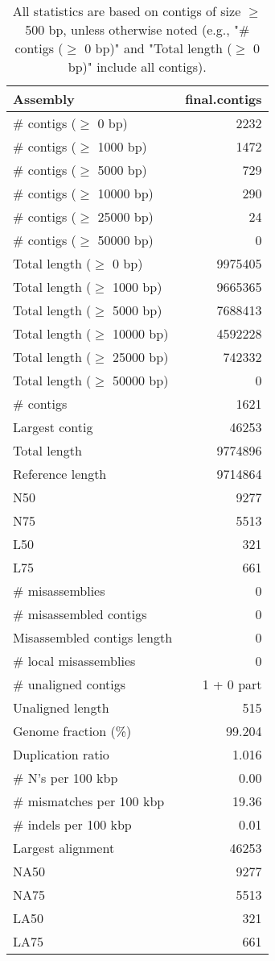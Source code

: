 \documentclass[12pt,a4paper]{article}
\begin{document}
\begin{table}[ht]
\begin{center}
\caption{All statistics are based on contigs of size $\geq$ 500 bp, unless otherwise noted (e.g., "\# contigs ($\geq$ 0 bp)" and "Total length ($\geq$ 0 bp)" include all contigs).}
\begin{tabular}{|l*{1}{|r}|}
\hline
Assembly & final.contigs \\ \hline
\# contigs ($\geq$ 0 bp) & 2232 \\ \hline
\# contigs ($\geq$ 1000 bp) & 1472 \\ \hline
\# contigs ($\geq$ 5000 bp) & 729 \\ \hline
\# contigs ($\geq$ 10000 bp) & 290 \\ \hline
\# contigs ($\geq$ 25000 bp) & 24 \\ \hline
\# contigs ($\geq$ 50000 bp) & 0 \\ \hline
Total length ($\geq$ 0 bp) & 9975405 \\ \hline
Total length ($\geq$ 1000 bp) & 9665365 \\ \hline
Total length ($\geq$ 5000 bp) & 7688413 \\ \hline
Total length ($\geq$ 10000 bp) & 4592228 \\ \hline
Total length ($\geq$ 25000 bp) & 742332 \\ \hline
Total length ($\geq$ 50000 bp) & 0 \\ \hline
\# contigs & 1621 \\ \hline
Largest contig & 46253 \\ \hline
Total length & 9774896 \\ \hline
Reference length & 9714864 \\ \hline
N50 & 9277 \\ \hline
N75 & 5513 \\ \hline
L50 & 321 \\ \hline
L75 & 661 \\ \hline
\# misassemblies & 0 \\ \hline
\# misassembled contigs & 0 \\ \hline
Misassembled contigs length & 0 \\ \hline
\# local misassemblies & 0 \\ \hline
\# unaligned contigs & 1 + 0 part \\ \hline
Unaligned length & 515 \\ \hline
Genome fraction (\%) & 99.204 \\ \hline
Duplication ratio & 1.016 \\ \hline
\# N's per 100 kbp & 0.00 \\ \hline
\# mismatches per 100 kbp & 19.36 \\ \hline
\# indels per 100 kbp & 0.01 \\ \hline
Largest alignment & 46253 \\ \hline
NA50 & 9277 \\ \hline
NA75 & 5513 \\ \hline
LA50 & 321 \\ \hline
LA75 & 661 \\ \hline
\end{tabular}
\end{center}
\end{table}
\end{document}
